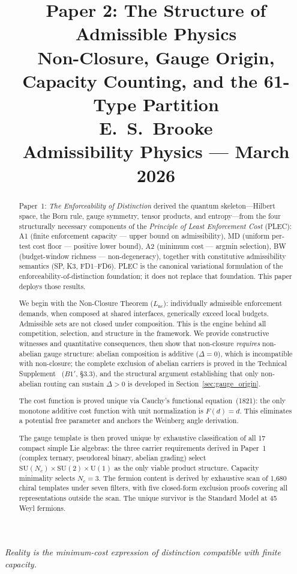 \documentclass[11pt]{article}
\title{
  \textbf{Paper 2: The Structure of Admissible Physics}\\
  \large Non-Closure, Gauge Origin, Capacity Counting, and the 61-Type Partition\\
  \normalsize E.\ S.\ Brooke\\
  Admissibility Physics --- March 2026
}
\author{}
\date{}
\newcommand{\SU}{\mathrm{SU}}
\newcommand{\U}{\mathrm{U}}
\begin{document}
\maketitle

\bigskip

\begin{center}
\textit{Reality is the minimum-cost expression of distinction compatible with finite capacity.}
\end{center}

\bigskip

\begin{abstract}
\noindent
Paper~1: \emph{The Enforceability of Distinction} derived the quantum skeleton---Hilbert space, the Born rule, gauge symmetry, tensor products, and entropy---from the four structurally necessary components of the \emph{Principle of Least Enforcement Cost} (PLEC): A1 (finite enforcement capacity --- upper bound on admissibility), MD (uniform per-test cost floor --- positive lower bound), A2 (minimum cost --- argmin selection), BW (budget-window richness --- non-degeneracy), together with constitutive admissibility semantics (SP, K3, FD1--FD6).  PLEC is the canonical variational formulation of the enforceability-of-distinction foundation; it does not replace that foundation.  This paper deploys those results.

We begin with the Non-Closure Theorem ($L_{\mathrm{nc}}$): individually admissible enforcement demands, when composed at shared interfaces, generically exceed local budgets.  Admissible sets are not closed under composition.  This is the engine behind all competition, selection, and structure in the framework.  We provide constructive witnesses and quantitative consequences, then show that non-closure \emph{requires} non-abelian gauge structure: abelian composition is additive ($\Delta = 0$), which is incompatible with non-closure; the complete exclusion of abelian carriers is proved in the Technical Supplement~\cite{BrookeP2Supplement} ($B1'$, \S3.3), and the structural argument establishing that only non-abelian routing can sustain $\Delta > 0$ is developed in Section~\ref{sec:gauge_origin}.

The cost function is proved unique via Cauchy's functional equation~(1821): the only monotone additive cost function with unit normalization is $F(d) = d$.  This eliminates a potential free parameter and anchors the Weinberg angle derivation.

The gauge template is then proved unique by exhaustive classification of all 17 compact simple Lie algebras: the three carrier requirements derived in Paper~1~\cite{BrookePaper1} (complex ternary, pseudoreal binary, abelian grading) select $\SU(N_c) \times \SU(2) \times \U(1)$ as the only viable product structure.  Capacity minimality selects $N_c = 3$.  The fermion content is derived by exhaustive scan of 1{,}680 chiral templates under seven filters, with five closed-form exclusion proofs covering all representations outside the scan.  The unique survivor is the Standard Model at 45 Weyl fermions.


\end{abstract}
\end{document}
